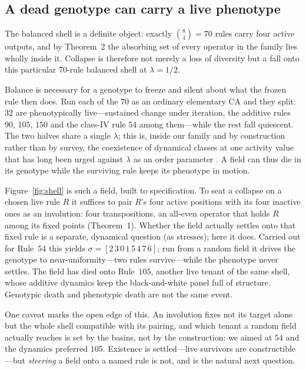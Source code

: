\documentclass[man,12pt,floatsintext,donotrepeattitle]{apa7}
\newcommand{\sig}{\sigma}
\newcommand{\secref}[1]{\emph{\nameref{#1}}}
\begin{document}
\subsection{A dead genotype can carry a live phenotype}
\label{sec:shell}

The balanced shell is a definite object: exactly $\binom{8}{4} = 70$ rules
carry four active outputs, and by Theorem~2 the absorbing set of
every operator in the family lies wholly inside it. Collapse is therefore not
merely a loss of diversity but a fall onto this particular $70$-rule balanced
shell at $\lambda = 1/2$.

Balance is necessary for a genotype to freeze and silent about what the frozen
rule then does. Run each of the $70$ as an ordinary elementary CA and they
split: $32$ are phenotypically live---sustained change under iteration, the
additive rules $90$, $105$, $150$ and the class-IV rule $54$ among them---while
the rest fall quiescent. The two halves share a single $\lambda$; this is,
inside our family and by construction rather than by survey, the coexistence of
dynamical classes at one activity value that has long been urged against
$\lambda$ as an order parameter \parencite{sakai2002edge}. A field can thus die
in its genotype while the surviving rule keeps its phenotype in motion.

Figure~\ref{fig:shell} is such a field, built to specification. To seat a
collapse on a chosen live rule $R$ it suffices to pair $R$'s four active
positions with its four inactive ones as an involution: four transpositions, an
all-even operator that holds $R$ among its fixed points (Theorem~1).
Whether the field actually settles onto that fixed rule is a separate, dynamical
question (as \secref{sec:interrupter} stresses); here it does. Carried out for
Rule~$54$ this yields
$\sig = [2\,3\,0\,1\,5\,4\,7\,6]$; run from a random field it drives the
genotype to near-uniformity---two rules survive---while the phenotype never
settles. The field has died onto Rule~$105$, another live tenant of the same
shell, whose additive dynamics keep the black-and-white panel full of
structure. Genotypic death and phenotypic death are not the same event.

One caveat marks the open edge of this. An involution fixes not its target
alone but the whole shell compatible with its pairing, and which tenant a
random field actually reaches is set by the basins, not by the construction: we
aimed at $54$ and the dynamics preferred $105$. Existence is settled---live
survivors are constructible---but \emph{steering} a field onto a named rule is
not, and is the natural next question.
\end{document}
